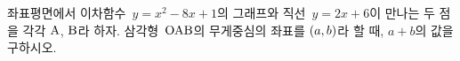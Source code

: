 좌표평면에서 이차함수~$y=x^2-8x+1$의 그래프와 직선~$y=2x+6$이 만나는 두 점을 각각 $\mathrm{A}$, $\mathrm{B}$라 하자. 삼각형~$\mathrm{OAB}$의 무게중심의 좌표를 $(a{,}\mkern3mu\mathopen{}b)$라 할 때, $a+b$의 값을 구하시오. 
